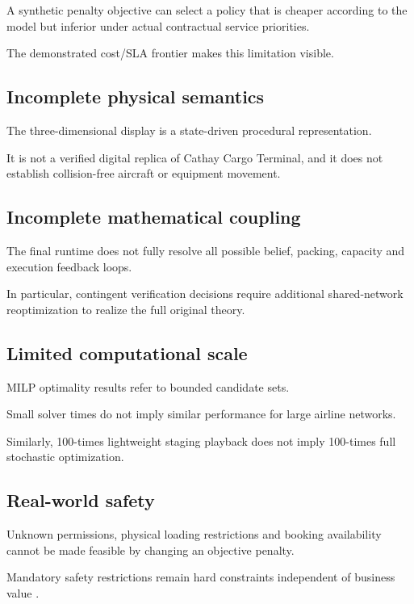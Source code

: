 \documentclass[10pt,a4paper]{article}
\theoremstyle{plain}
\theoremstyle{definition}
\theoremstyle{remark}
\begin{document}
A synthetic penalty objective
can select a policy that is
cheaper according to the model
but inferior under actual
contractual service priorities.

The demonstrated cost/SLA frontier
makes this limitation visible.

\subsection{Incomplete physical semantics}

The three-dimensional display
is a state-driven procedural
representation.

It is not a verified digital replica
of Cathay Cargo Terminal,
and it does not establish
collision-free aircraft or equipment
movement.

\subsection{Incomplete mathematical coupling}

The final runtime does not
fully resolve all possible
belief, packing, capacity and
execution feedback loops.

In particular, contingent
verification decisions require
additional shared-network reoptimization
to realize the full original theory.

\subsection{Limited computational scale}

MILP optimality results refer
to bounded candidate sets.

Small solver times do not imply
similar performance for
large airline networks.

Similarly, 100-times
lightweight staging playback
does not imply 100-times
full stochastic optimization.

\subsection{Real-world safety}

Unknown permissions,
physical loading restrictions
and booking availability
cannot be made feasible
by changing an objective penalty.

Mandatory safety restrictions
remain hard constraints
independent of business value
\cite{iatauld}.

\end{document}
